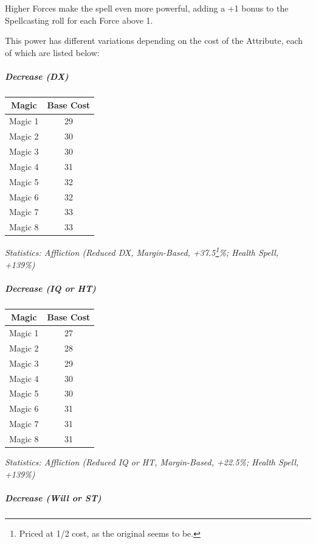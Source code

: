\begin{multicols*}{3}
	Higher Forces make the spell even more powerful, adding a +1 bonus to the Spellcasting roll for each Force above 1.
	
	This power has different variations depending on the cost of the Attribute, each of which are listed below:
	
	\subparagraph{Decrease (DX)}
	
	\begin{center}
		\begin{tabular}{|c|c|}
			\hline
			Magic & Base Cost \\
			\hline
			\hline
			Magic 1 & 29 \\
			Magic 2 & 30 \\
			Magic 3 & 30 \\
			Magic 4 & 31 \\
			Magic 5 & 32 \\
			Magic 6 & 32 \\
			Magic 7 & 33 \\
			Magic 8 & 33 \\
			\hline
		\end{tabular}
	\end{center}	
	
	\textcolor{OliveGreen}{\textit{Statistics: Affliction (Reduced DX, Margin-Based, +37.5\footnote{Priced at 1/2 cost, as the original seems to be.}\%; Health Spell, +139\%) }}
	
	\subparagraph{Decrease (IQ or HT)}
	
	\begin{center}
		\begin{tabular}{|c|c|}
			\hline
			Magic & Base Cost \\
			\hline
			\hline
			Magic 1 & 27 \\
			Magic 2 & 28 \\
			Magic 3 & 29  \\
			Magic 4 & 30 \\
			Magic 5 & 30 \\
			Magic 6 & 31 \\
			Magic 7 & 31 \\
			Magic 8 & 31 \\
			\hline
		\end{tabular}
	\end{center}	
	
	\textcolor{OliveGreen}{\textit{Statistics: Affliction (Reduced IQ or HT, Margin-Based, +22.5\%; Health Spell, +139\%) }}
	
	\subparagraph{Decrease (Will or ST)}
	

\end{multicols*}
